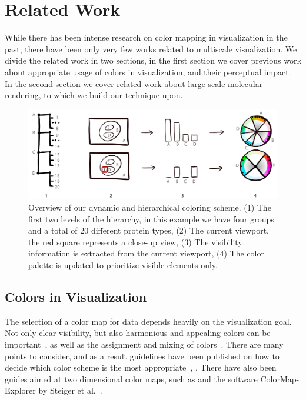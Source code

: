 \documentclass[review,journal]{vgtc}         %
\begin{document}
\section{Related Work}
While there has been intense research on color mapping in visualization in the past, there have been only very few works related to multiscale visualization.
We divide the related work in two sections, in the first section we cover previous work about appropriate usage of colors in visualization, and their perceptual impact. 
In the second section we cover related work about large scale molecular rendering, to which we build our technique upon.

\begin{figure}[t]
	\centering
	\includegraphics[width=0.85\linewidth]{Figures/coloroverview}
	\caption{Overview of our dynamic and hierarchical coloring scheme. (1) The first two levels of the hierarchy, in this example we have four groups and a total of 20 different protein types, (2) The current viewport, the red square represents a close-up view, (3) The visibility information is extracted from the current viewport, (4) The color palette is updated to prioritize visible elements only.}
	\label{fig:coloroverview}
\end{figure}



\subsection{Colors in Visualization}
The selection of  a color map for data depends heavily on the visualization goal. 
Not only clear visibility, but also harmonious and appealing colors can be important~\cite{ihaka2003colour}, as well as the assignment and mixing of colors~\cite{wang2008color}. 
There are many points to consider, and as a result guidelines have been published on how to decide which color scheme is the most appropriate~\cite{bergman1995rule}, \cite{healey1996choosing}. There have also been guides aimed at two dimensional color maps, such as \cite{bernard2015survey} and the software ColorMap-Explorer by Steiger et al.~\cite{steiger2015explorative}.
\end{document}
